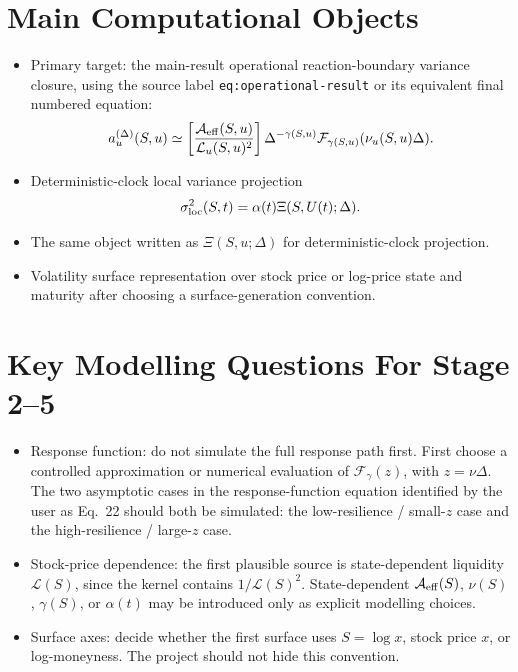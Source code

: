\documentclass[11pt]{article}
\begin{document}
\section*{Main Computational Objects}
\begin{itemize}
  \item Primary target: the main-result operational reaction-boundary
  variance closure, using the source label \texttt{eq:operational-result}
  or its equivalent final numbered equation:
  \[
    a_u^{(\Delta)}(S,u)
    \simeq
    \left[\frac{\mathcal A_{\rm eff}(S,u)}{\mathcal L_u(S,u)^2}\right]
    \Delta^{-\gamma(S,u)}
    \mathcal F_{\gamma(S,u)}(\nu_u(S,u)\Delta).
  \]
  \item Deterministic-clock local variance projection
  \[
    \sigma_{\rm loc}^2(S,t)=\alpha(t)\Xi(S,U(t);\Delta).
  \]
  \item The same object written as
  \(\Xi(S,u;\Delta)\) for deterministic-clock projection.
  \item Volatility surface representation over stock price or log-price
  state and maturity after choosing a surface-generation convention.
\end{itemize}

\section*{Key Modelling Questions For Stage 2--5}
\begin{itemize}
  \item Response function: do not simulate the full response path first.
  First choose a controlled approximation or numerical evaluation of
  \(\mathcal F_\gamma(z)\), with \(z=\nu\Delta\).
  The two asymptotic cases in the response-function equation identified
  by the user as Eq.~22 should both be simulated: the low-resilience /
  small-\(z\) case and the high-resilience / large-\(z\) case.
  \item Stock-price dependence: the first plausible source is
  state-dependent liquidity \(\mathcal L(S)\), since the kernel contains
  \(1/\mathcal L(S)^2\). State-dependent \(\mathcal A_{\rm eff}(S)\),
  \(\nu(S)\), \(\gamma(S)\), or \(\alpha(t)\) may be introduced only as
  explicit modelling choices.
  \item Surface axes: decide whether the first surface uses \(S=\log x\),
  stock price \(x\), or log-moneyness. The project should not hide this
  convention.
\end{itemize}
\end{document}
